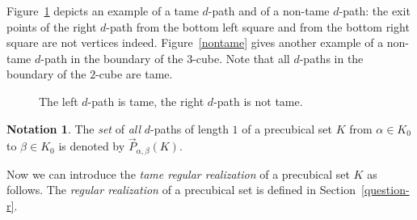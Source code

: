 \documentclass[a4paper,12pt]{amsart}
\renewcommand{\vec}{\overrightarrow}
\theoremstyle{definition}
\newtheorem{nota}[thm]{Notation}
\begin{document}
Figure~\ref{tame-nontame} depicts an example of a tame $d$-path and of a non-tame $d$-path: the exit points of the right $d$-path from the bottom left square and from the bottom right square are not vertices indeed. Figure~\ref{nontame} gives another example of a non-tame $d$-path in the boundary of the $3$-cube. Note that all $d$-paths in the boundary of the $2$-cube are tame.

\begin{figure}
	\caption{The left $d$-path is tame, the right $d$-path is not tame.}
	\label{tame-nontame}
\end{figure}


\begin{nota}
	The \textit{set} of \textit{all} $d$-paths of length $1$ of a precubical set $K$ from $\alpha\in K_0$ to $\beta\in K_0$ is denoted by $\vec{P}_{\alpha,\beta}(K)$.
\end{nota}

Now we can introduce the \textit{tame regular realization} of a precubical set $K$ as follows. The \textit{regular realization} of a precubical set is defined in Section~\ref{question-r}.
\end{document}
